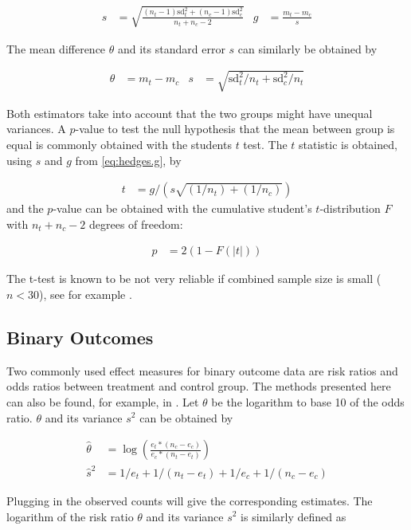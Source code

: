 \begin{align}
s &= \sqrt{\frac{(n_t - 1)\textrm{sd}_t^2 + (n_c - 1)\textrm{sd}_c^2}{n_t + n_c - 2}} & g &= \frac{m_t - m_c}{s} \label{eq:hedges.g}
\end{align}

The mean difference $\theta$ and its standard error $s$ can similarly be obtained by

\begin{align}
\theta &= m_t - m_c & s &= \sqrt{\textrm{sd}_t^2/n_t + \textrm{sd}_c^2/n_t}
\end{align}

Both estimators take into account that the two groups might have unequal variances. A $p$-value to test the null hypothesis that the mean between group is equal is commonly obtained with the students $t$ test. The $t$ statistic is obtained, using $s$ and $g$ from \ref{eq:hedges.g}, by

\begin{align}
t &= g/(s\sqrt{(1/n_t)+(1/n_c)}) \nonumber
\end{align}
and the $p$-value can be obtained with the cumulative student's $t$-distribution $F$ with $n_t + n_c - 2$ degrees of freedom:

\begin{align}
p &= 2(1-F(|t|)) \nonumber
\end{align}

The t-test is known to be not very reliable if combined sample size is small ($n < 30$), see for example \citet{t.test}.

\subsection{Binary Outcomes}
Two commonly used effect measures for binary outcome data are risk ratios and odds ratios between treatment and control group. 
The methods presented here can also be found, for example, in \cite[34]{Intro.meta}.
Let $\theta$ be the logarithm to base 10 of the odds ratio. $\theta$ and its variance $s^2$ can be obtained by 

\begin{align}
\hat{\theta} &= \log(\frac{e_t*(n_c - e_c)}{e_c*(n_t - e_t)}) \nonumber \\
\hat{s}^2 &= 1/e_t + 1/(n_t - e_t) + 1/e_c + 1/(n_c - e_c) \nonumber
\end{align}

Plugging in the observed counts will give the corresponding estimates. The logarithm of the risk ratio $\theta$ and its variance $s^2$ is similarly defined as

